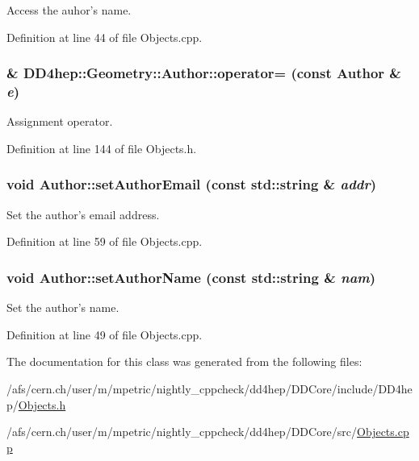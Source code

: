 Access the auhor's name. 

Definition at line 44 of file Objects.cpp.\hypertarget{class_d_d4hep_1_1_geometry_1_1_author_a59a753444504866fdb2c4e798823cd17}{
\subsubsection[{operator=}]{\& DD4hep::Geometry::Author::operator= (const {\bf Author} \& {\em e})}}
\label{class_d_d4hep_1_1_geometry_1_1_author_a59a753444504866fdb2c4e798823cd17}


Assignment operator. 

Definition at line 144 of file Objects.h.\hypertarget{class_d_d4hep_1_1_geometry_1_1_author_a0e51de9a1fef12422800b96164296ae4}{
\subsubsection[{setAuthorEmail}]{\setlength{\rightskip}{0pt plus 5cm}void Author::setAuthorEmail (const std::string \& {\em addr})}}
\label{class_d_d4hep_1_1_geometry_1_1_author_a0e51de9a1fef12422800b96164296ae4}


Set the author's email address. 

Definition at line 59 of file Objects.cpp.\hypertarget{class_d_d4hep_1_1_geometry_1_1_author_aca1a9559e7b890d4b817b1a5286a034a}{
\subsubsection[{setAuthorName}]{\setlength{\rightskip}{0pt plus 5cm}void Author::setAuthorName (const std::string \& {\em nam})}}
\label{class_d_d4hep_1_1_geometry_1_1_author_aca1a9559e7b890d4b817b1a5286a034a}


Set the author's name. 

Definition at line 49 of file Objects.cpp.

The documentation for this class was generated from the following files:\begin{DoxyCompactItemize}
\item 
/afs/cern.ch/user/m/mpetric/nightly\_\-cppcheck/dd4hep/DDCore/include/DD4hep/\hyperlink{_objects_8h}{Objects.h}\item 
/afs/cern.ch/user/m/mpetric/nightly\_\-cppcheck/dd4hep/DDCore/src/\hyperlink{_objects_8cpp}{Objects.cpp}\end{DoxyCompactItemize}
